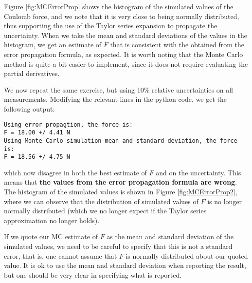 Figure \ref{fig:MCErrorProp} shows the histogram of the simulated values of the Coulomb force, and we note that it is very close to being normally distributed, thus supporting the use of the Taylor series expansion to propagate the uncertainty. When we take the mean and standard deviations of the values in the histogram, we get an estimate of $F$ that is consistent with the obtained from the error propagation formula, as expected. It is worth noting that the Monte Carlo method is quite a bit easier to implement, since it does not require evaluating the partial derivatives.

We now repeat the same exercise, but using 10\% relative uncertainties on all measurements. Modifying the relevant lines in the python code, we get the following output:
\begin{verbatim}
Using error propagtion, the force is:
F = 18.00 +/ 4.41 N
Using Monte Carlo simulation mean and standard deviation, the force is:
F = 18.56 +/ 4.75 N
\end{verbatim}
which now disagree in both the best estimate of $F$ and on the uncertainty. This means that \textbf{the values from the error propagation formula are wrong}. The histogram of the simulated values is shown in Figure \ref{fig:MCErrorProp2}, where we can observe that the distribution of simulated values of $F$ is no longer normally distributed (which we no longer expect if the Taylor series approximation no longer holds).

If we quote our MC estimate of $F$ as the mean and standard deviation of the simulated values, we need to be careful to specify that this is not a standard error, that is, one cannot assume that $F$ is normally distributed about our quoted value. It is ok to use the mean and standard deviation when reporting the result, but one should be very clear in specifying what is reported.


